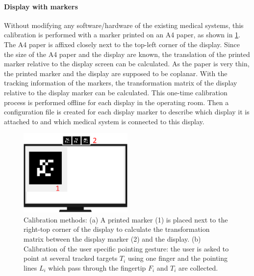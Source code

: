 \paragraph{Display with markers}
Without modifying any software/hardware of the existing medical systems, this calibration is performed with a marker printed on an A4 paper, as shown in  \figurename{\ref{fig:3-PointingOR:Calibration}}. 
The A4 paper is affixed closely next to the top-left corner of the display. Since the size of the A4 paper and the display are known, the translation of the printed marker relative to the display screen can be calculated. As the paper is very thin, the printed marker and the display are supposed to be coplanar. With the tracking information of the markers, the transformation matrix of the display relative to the display marker can be calculated. This one-time calibration process is performed offline for each display in the operating room. Then a configuration file is created for each display marker to describe which display it is attached to and which medical system is connected to this display. 
\begin{figure} [htb]
	\centering
	\includegraphics[width=0.5\textwidth]{figures/3-PointingOR/Calibration.png}
	\caption{Calibration methods: (a) A printed marker (1) is placed next to the right-top corner of the display to calculate the transformation matrix between the display marker (2) and the display. (b) Calibration of the user specific pointing gesture: the user is asked to point at several tracked targets $T_i$ using one finger and the pointing lines $L_i$ which pass through the fingertip $F_i$ and $T_i$ are collected.}
	\label{fig:3-PointingOR:Calibration}       %
\end{figure}
